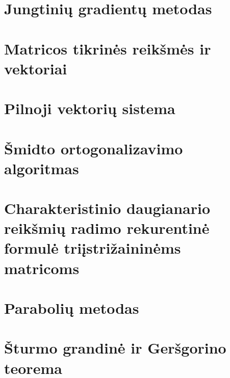 \section{Jungtinių gradientų metodas}
\cite[120-121]{textbook}

\section{Matricos tikrinės reikšmės ir vektoriai}
\section{Pilnoji vektorių sistema}
\cite[134]{textbook}
\section{Šmidto ortogonalizavimo algoritmas}
\cite[201]{textbook}
\section{Charakteristinio daugianario reikšmių radimo rekurentinė
formulė triįstrižaininėms matricoms}
\cite[135]{textbook}
\section{Parabolių metodas}
\cite[136-137]{textbook}
\section{Šturmo grandinė ir Geršgorino teorema}
\cite[144]{textbook}
